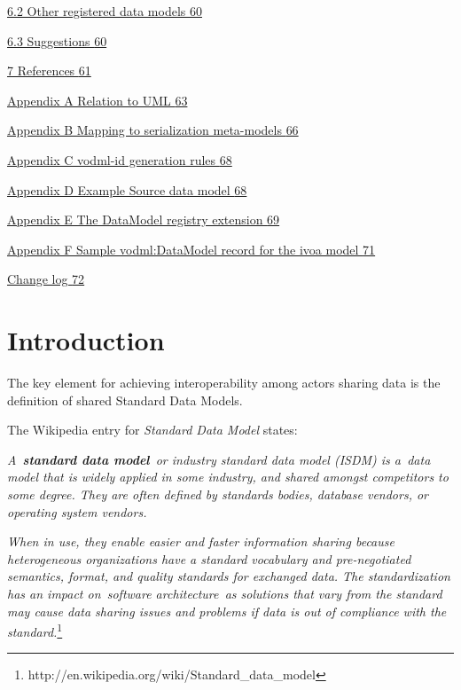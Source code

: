 \documentclass[10pt,a4paper]{ivoa}
\begin{document}
\protect\hyperlink{other-registered-data-models}{6.2 Other registered
data models \protect\hyperlink{other-registered-data-models}{60}}

\protect\hyperlink{suggestions}{6.3 Suggestions
\protect\hyperlink{suggestions}{60}}

\protect\hyperlink{references}{7 References
\protect\hyperlink{references}{61}}

\protect\hyperlink{relation-to-uml}{Appendix A Relation to UML
\protect\hyperlink{relation-to-uml}{63}}

\protect\hyperlink{mapping-to-serialization-meta-models}{Appendix B
Mapping to serialization meta-models
\protect\hyperlink{mapping-to-serialization-meta-models}{66}}

\protect\hyperlink{vodml-id-generation-rules}{Appendix C vodml-id
generation rules \protect\hyperlink{vodml-id-generation-rules}{68}}

\protect\hyperlink{example-source-data-model}{Appendix D Example Source
data model \protect\hyperlink{example-source-data-model}{68}}

\protect\hyperlink{the-datamodel-registry-extension}{Appendix E The
DataModel registry extension
\protect\hyperlink{the-datamodel-registry-extension}{69}}

\protect\hyperlink{sample-vodmldatamodel-record-for-the-ivoa-model}{Appendix
F Sample vodml:DataModel record for the ivoa model
\protect\hyperlink{sample-vodmldatamodel-record-for-the-ivoa-model}{71}}

\protect\hyperlink{change-log}{Change log
\protect\hyperlink{change-log}{72}}

\hypertarget{introduction}{%
\section{Introduction}\label{introduction}}

The key element for achieving interoperability among actors sharing data
is the definition of shared Standard Data Models.

The Wikipedia entry for \emph{Standard Data Model} states:

\emph{A~\textbf{standard data model}~or industry standard data model
(ISDM) is a~data model that is widely applied in some industry, and
shared amongst competitors to some degree. They are often defined by
standards bodies, database vendors, or operating system vendors.}

\emph{When in use, they enable easier and faster information sharing
because heterogeneous organizations have a standard vocabulary and
pre-negotiated semantics, format, and quality standards for exchanged
data. The standardization has an impact on~software architecture~as
solutions that vary from the standard may cause data sharing issues and
problems if data is out of compliance with the standard.}\footnote{http://en.wikipedia.org/wiki/Standard\_data\_model}
\end{document}
